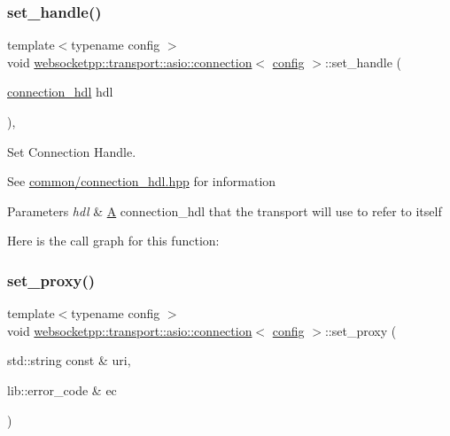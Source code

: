 \subsubsection{\texorpdfstring{set\+\_\+handle()}{set\_handle()}}
{\footnotesize\ttfamily template$<$typename config $>$ \\
void \mbox{\hyperlink{classwebsocketpp_1_1transport_1_1asio_1_1connection}{websocketpp\+::transport\+::asio\+::connection}}$<$ \mbox{\hyperlink{classconfig}{config}} $>$\+::set\+\_\+handle (\begin{DoxyParamCaption}\item[{\mbox{\hyperlink{namespacewebsocketpp_a6b3d26a10ee7229b84b776786332631d}{connection\+\_\+hdl}}}]{hdl }\end{DoxyParamCaption})\hspace{0.3cm}{\ttfamily [inline]}, {\ttfamily [protected]}}



Set Connection Handle. 

See \mbox{\hyperlink{connection__hdl_8hpp_source}{common/connection\+\_\+hdl.\+hpp}} for information


\begin{DoxyParams}{Parameters}
{\em hdl} & \mbox{\hyperlink{struct_a}{A}} connection\+\_\+hdl that the transport will use to refer to itself \\
\hline
\end{DoxyParams}
Here is the call graph for this function\+:
\mbox{\label{classwebsocketpp_1_1transport_1_1asio_1_1connection_a9638063c7c8c90c74d97008dacd81095}} 
\subsubsection{\texorpdfstring{set\+\_\+proxy()}{set\_proxy()}}
{\footnotesize\ttfamily template$<$typename config $>$ \\
void \mbox{\hyperlink{classwebsocketpp_1_1transport_1_1asio_1_1connection}{websocketpp\+::transport\+::asio\+::connection}}$<$ \mbox{\hyperlink{classconfig}{config}} $>$\+::set\+\_\+proxy (\begin{DoxyParamCaption}\item[{std\+::string const \&}]{uri,  }\item[{lib\+::error\+\_\+code \&}]{ec }\end{DoxyParamCaption})\hspace{0.3cm}{\ttfamily [inline]}}



